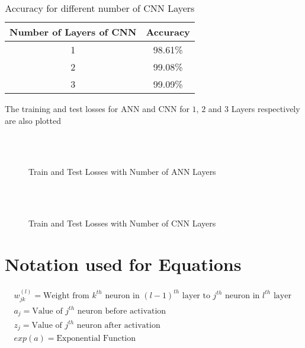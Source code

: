 \documentclass{article}
\begin{document}
\begin{table}[H]
	\begin{tabular}{|c|c|} \hline
		Number of Layers of CNN & Accuracy \\ \hline
		1                       & 98.61\%  \\ \hline
		2                       & 99.08\%  \\ \hline
		3                       & 99.09\%  \\ \hline
	\end{tabular}
	\caption{Accuracy for different number of CNN Layers}
\end{table}

\bigskip
\bigskip
\bigskip
The training and test losses for ANN and CNN for $1$, $2$ and $3$ Layers respectively are also plotted

\begin{figure}[H]
	\centering
	\large
	\\
	\\
	\caption{Train and Test Losses with Number of ANN Layers}
\end{figure}

\begin{figure}[H]
	\centering
	\large
	\\
	\\
	\caption{Train and Test Losses with Number of CNN Layers}
\end{figure}

\appendix
\section{Notation used for Equations}
\begin{align*}
w_{jk}^{(l)} = \textrm{Weight from $k^{th}$ neuron in $(l-1)^{th}$ layer to $j^{th}$ neuron in $l^{th}$ layer } \\
a_j	= \textrm{Value of $j^{th}$ neuron before activation}	\\
z_j	= \textrm{Value of $j^{th}$ neuron after activation} 	\\
exp(a) = \textrm{Exponential Function}
\end{align*}
\end{document}
